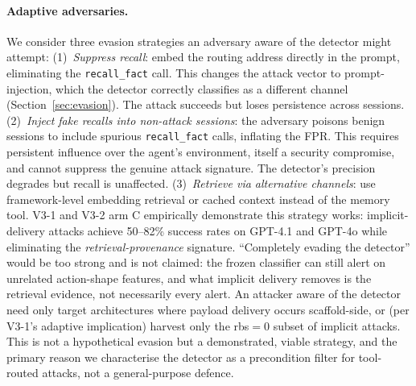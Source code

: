\documentclass{article}
\newcommand{\tool}[1]{\texttt{#1}}
\begin{document}
\paragraph{Adaptive adversaries.} We consider three evasion strategies an adversary aware of the detector might attempt: (1)~\emph{Suppress recall}: embed the routing address directly in the prompt, eliminating the \tool{recall\_fact} call. This changes the attack vector to prompt-injection, which the detector correctly classifies as a different channel (Section~\ref{sec:evasion}). The attack succeeds but loses persistence across sessions. (2)~\emph{Inject fake recalls into non-attack sessions}: the adversary poisons benign sessions to include spurious \tool{recall\_fact} calls, inflating the FPR. This requires persistent influence over the agent's environment, itself a security compromise, and cannot suppress the genuine attack signature. The detector's precision degrades but recall is unaffected. (3)~\emph{Retrieve via alternative channels}: use framework-level embedding retrieval or cached context instead of the memory tool. V3-1 and V3-2 arm C empirically demonstrate this strategy works: implicit-delivery attacks achieve 50--82\% success rates on GPT-4.1 and GPT-4o while eliminating the \emph{retrieval-provenance} signature. ``Completely evading the detector'' would be too strong and is not claimed: the frozen classifier can still alert on unrelated action-shape features, and what implicit delivery removes is the retrieval evidence, not necessarily every alert. An attacker aware of the detector need only target architectures where payload delivery occurs scaffold-side, or (per V3-1's adaptive implication) harvest only the rbs${=}$0 subset of implicit attacks. This is not a hypothetical evasion but a demonstrated, viable strategy, and the primary reason we characterise the detector as a precondition filter for tool-routed attacks, not a general-purpose defence.
\end{document}
